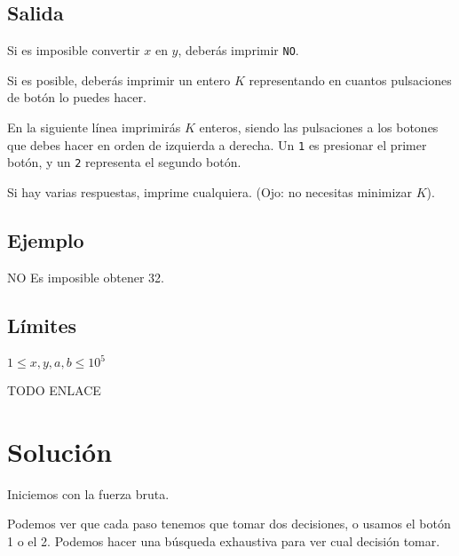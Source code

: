 \subsection*{Salida}
Si es imposible convertir \(x\) en \(y\), deberás imprimir \verb|NO|.

Si es posible, deberás imprimir un entero \(K\) representando en cuantos pulsaciones de botón lo puedes hacer.

En la siguiente línea imprimirás \(K\) enteros, siendo las pulsaciones a los botones que debes hacer en orden de izquierda a derecha. Un \verb|1| es presionar el primer botón, y un \verb|2| representa el segundo botón.

Si hay varias respuestas, imprime cualquiera. (Ojo: no necesitas minimizar \(K\)).
\subsection*{Ejemplo}
\begin{casebox3}
	 {
		NO
	}{
		Es imposible obtener 32.
	}
\end{casebox3}

\subsection*{Límites}
\begin{plimits}
	\item \(1\leq x, y, a, b \leq 10^5\)
\end{plimits}

TODO ENLACE

\section*{Solución}

Iniciemos con la fuerza bruta.

Podemos ver que cada paso tenemos que tomar dos decisiones, o usamos el botón 1 o el 2. Podemos hacer una búsqueda exhaustiva para ver cual decisión tomar.

